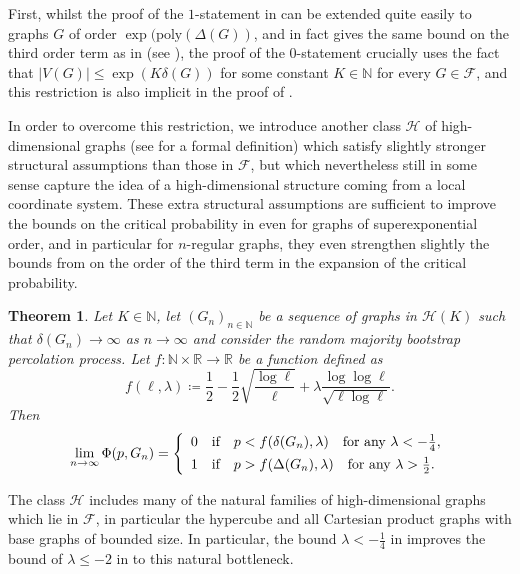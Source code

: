 \documentclass[reqno,a4paper,11pt]{amsart}
\newtheorem{theorem}{Theorem}[section]
\theoremstyle{definition}
\renewcommand{\leq}{\leqslant}
\begin{document}
First, whilst the proof of the $1$-statement in  can be extended quite easily to graphs $G$ of order $\exp(\text{poly}(\Delta(G))$, and in fact gives the same bound on the third order term as in  (see \cite[Remark 4.4]{CEGK24}), the proof of the $0$-statement crucially uses the fact that $|V(G)| \leq \exp(K \delta(G))$ for some constant $K\in \mathbb{N}$ for every $G \in \mathcal{F}$, and this restriction is also implicit in the proof of .

In order to overcome this restriction, we introduce another class $\mathcal{H}$ of high-dimensional graphs (see  for a formal definition) which satisfy slightly stronger structural assumptions than those in $\mathcal{F}$, but which nevertheless still in some sense capture the idea of a high-dimensional structure coming from a local coordinate system.
These extra structural assumptions are sufficient to improve the bounds on the critical probability in  even for graphs of superexponential order, and in particular for $n$-regular graphs, they even strengthen slightly the bounds from  on the order of the third term in the expansion of the critical probability.

\begin{theorem}\label{t:mainThm-newH}
  Let $K \in \mathbb{N}$, let $(G_n)_{n \in \mathbb{N}}$ be a sequence of graphs in $\mathcal{H}(K)$ such that $\delta(G_n) \to \infty$ as $n \to \infty$ and consider the random majority bootstrap percolation process.
  Let $f\colon\mathbb{N} \times \mathbb{R} \to \mathbb{R}$ be a function defined as
  \[
    f(\ell, \lambda) \coloneqq \frac{1}{2}-\frac{1}{2} \sqrt{\frac{\log \ell}{\ell}}+ \lambda \frac{ \log \log \ell}{\sqrt{\ell \log \ell}}.
  \]
  Then
  \[
    \lim_{n \to \infty} \Phi(p, G_n) = \left\{
      \begin{array} {c@{\quad \textup{if} \quad}l}
        0 & p < f(\delta(G_n), \lambda) \quad \text{for any } \lambda < -\frac{1}{4}, \\[+1ex]
        1 & p > f(\Delta(G_n), \lambda) \quad \text{for any } \lambda> \frac{1}{2}.
      \end{array}\right.
  \]
\end{theorem}

The class $\mathcal{H}$ includes many of the natural families of high-dimensional graphs which lie in $\mathcal{F}$, in particular the hypercube and all Cartesian product graphs with base graphs of bounded size.
In particular, the bound $\lambda < -\frac{1}{4}$ in  improves the bound of $\lambda \leq -2$ in  to this natural bottleneck.
\end{document}
